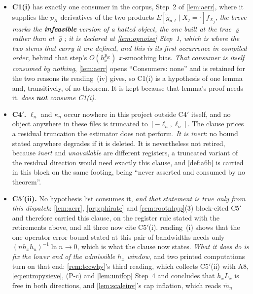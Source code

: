 \begin{itemize}
\item[--] \textbf{C1(i)} has exactly one consumer in the corpus, Step~2 of \cref{lem:aerr}, where it supplies
the $p_K$ derivatives of the two products $E[\breve g_{u,t}\mid X_j=\cdot]f_{X_j}$, \emph{the breve
marks the \textbf{infeasible} version of a hatted object, the one built at the true $\varrho$ rather
than at $\hat\varrho$; it is declared at \cref{lem:opnoise} Step~1, which is where the two stems that
carry it are defined, and this is its first occurrence in compiled order}, behind that step's
$O(h_x^{p_K})$ $x$-smoothing bias. \emph{That consumer is itself consumed by nothing}, \cref{lem:aerr}
opens ``Consumers: none'' and is retained for the two reasons its reading~\textup{(iv)} gives, so C1(i) is
a hypothesis of one lemma and, transitively, of no theorem. It is kept because that lemma's proof needs it.
\emph{ does \textbf{not} consume C1(i)}.
\item[--] \textbf{C4$'$.} $\ell_n$ and $\kappa_n$ occur nowhere in this project outside C4$'$ itself, and no
object anywhere in these files is truncated to $[-\ell_n,\ell_n]$. The clause prices a residual truncation
the estimator does not perform. \emph{It is inert}: no bound stated anywhere degrades if it is deleted. It is
nevertheless not retired, because \emph{inert} and \emph{unavailable} are different registers, a truncated
variant of the residual direction would need exactly this clause, and \cref{def:a6b} is carried in this block
on the same footing, being ``never asserted and consumed by no theorem''.
\item[--] \textbf{C5$'$(ii).} No hypothesis list consumes it, \emph{and that statement is true only from
this dispatch}: \cref{lem:aerr}, \cref{prp:phirate} and \cref{rem:rootnhyp}\textup{(3)} block-cited C5$'$ and
therefore carried this clause, on the register rule stated with the retirements above, and all three now cite
C5$'$(i).  reading~\textup{(i)} shows that the one operator-error bound stated at this pair of
bandwidths needs only $(nh_xh_u)^{-1}\ln n\to0$, which is what the clause now states.
\emph{What it does do is fix the lower end of the admissible $h_x$ window}, and two printed computations turn
on that end: \cref{rem:tccwhy}'s third reading,
which collects C5$'$(ii) with A8, \eqref{eq:entropysieve}, (P-c) and \cref{lem:unifop} Step~4 and concludes
that $h_xL_x$ is free in both directions, and \cref{lem:scaleinv}'s cap inflation, which reads $\bar m_n$

\end{itemize}
